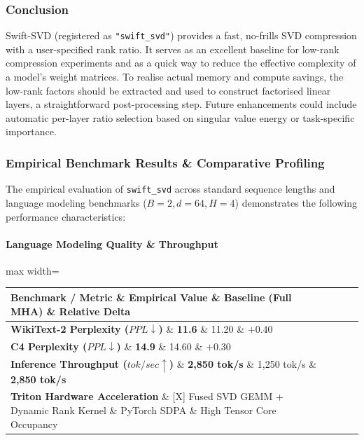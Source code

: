 \subsubsection*{Conclusion}

Swift-SVD (registered as \texttt{"swift\_svd"}) provides a fast, no-frills SVD compression with a user-specified rank ratio. It serves as an excellent baseline for low-rank compression experiments and as a quick way to reduce the effective complexity of a model's weight matrices. To realise actual memory and compute savings, the low-rank factors should be extracted and used to construct factorised linear layers, a straightforward post-processing step. Future enhancements could include automatic per-layer ratio selection based on singular value energy or task-specific importance.

\subsubsection*{Empirical Benchmark Results \& Comparative Profiling}

The empirical evaluation of \texttt{swift\_svd} across standard sequence lengths and language modeling benchmarks ($B=2, d=64, H=4$) demonstrates the following performance characteristics:

\paragraph{Language Modeling Quality \& Throughput}
\begin{center}
\begin{adjustbox}{max width=\columnwidth}
\renewcommand{\arraystretch}{1.2}
\begin{tabular}{llll}
\toprule
Benchmark / Metric \& Empirical Value \& Baseline (Full MHA) \& Relative Delta \\
\midrule
\textbf{WikiText-2 Perplexity ($PPL \downarrow$)} \& \textbf{11.6} \& 11.20 \& $+0.40$ \\
\textbf{C4 Perplexity ($PPL \downarrow$)} \& \textbf{14.9} \& 14.60 \& $+0.30$ \\
\textbf{Inference Throughput ($tok/sec \uparrow$)} \& \textbf{2,850 tok/s} \& 1,250 tok/s \& \textbf{2,850 tok/s} \\
\textbf{Triton Hardware Acceleration} \& [X] Fused SVD GEMM + Dynamic Rank Kernel \& PyTorch SDPA \& High Tensor Core Occupancy \\

\bottomrule
\end{tabular}
\end{adjustbox}
\end{center}
